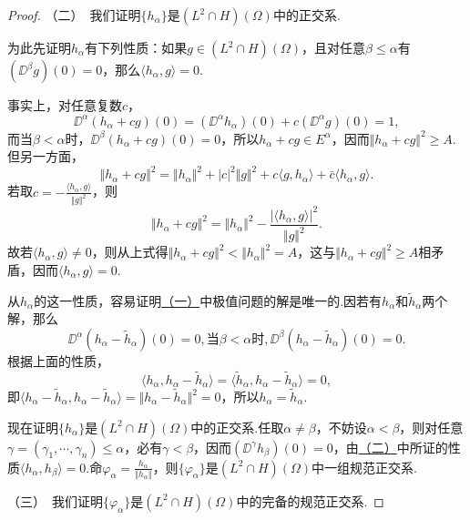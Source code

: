 \begin{proof}
	（二）\,
	我们证明$\{h_\alpha\}$是$(L^2\cap H)(\Omega)$中的正交系.
	
	为此先证明$h_\alpha$有下列性质：如果$g\in(L^2\cap H)(\Omega)$，且对任意$\beta\le\alpha$有$(\DD^\beta g)(0)=0$，那么$\langle h_\alpha,g\rangle=0$.
	
	事实上，对任意复数$c$，
	\[\DD^\alpha (h_\alpha+cg)(0)=(\DD^\alpha h_\alpha)(0)+c(\DD^\alpha g)(0)=1,\]
	而当$\beta<\alpha$时，$\DD^\beta(h_\alpha+cg)(0)=0$，所以$h_\alpha+cg\in E^\alpha$，因而$\Vert h_\alpha+cg\Vert^2\ge A$.但另一方面，
	\[\Vert h_\alpha+cg\Vert^2=\Vert h_\alpha\Vert^2+|c|^2\Vert g\Vert^2+c\langle g,h_\alpha\rangle+\bar{c}\langle h_\alpha,g\rangle.\]
	若取$c=-\frac{\langle h_\alpha,g\rangle}{\Vert g\Vert^2}$，则
	\[\Vert h_\alpha+cg\Vert^2=\Vert h_\alpha\Vert^2-\frac{\left|\langle h_\alpha,g\rangle\right|^2}{\Vert g\Vert^2}.\]
	故若$\langle h_\alpha,g\rangle\neq0$，则从上式得$\Vert h_\alpha+cg\Vert^2<\Vert h_\alpha\Vert^2=A$，这与$\Vert h_\alpha+cg\Vert^2\ge A$相矛盾，因而$\langle h_\alpha,g\rangle=0$.
	
	从$h_\alpha$的这一性质，容易证明\hyperlink{3.1.11}{（一）}中极值问题的解是唯一的.因若有$h_\alpha$和$\tilde{h}_\alpha$两个解，那么
	\[\DD^\alpha(h_\alpha-\tilde{h}_\alpha)(0)=0,\text{当}\beta<\alpha\text{时},\DD^\beta(h_\alpha-\tilde{h}_\alpha)(0)=0.\]
	根据上面的性质，
	\[\langle h_\alpha,h_\alpha-\tilde{h}_\alpha\rangle=\langle\tilde{h}_\alpha,h_\alpha-\tilde{h}_\alpha\rangle=0,\]
	即$\langle h_\alpha-\tilde{h}_\alpha,h_\alpha-\tilde{h}_\alpha\rangle=\Vert h_\alpha-\tilde{h}_\alpha\Vert^2=0$，所以$h_\alpha=\tilde{h}_\alpha$.
	
	现在证明$\{h_\alpha\}$是$(L^2\cap H)(\Omega)$中的正交系.任取$\alpha\neq\beta$，不妨设$\alpha<\beta$，则对任意$\gamma=(\gamma_1,\cdots,\gamma_n)\le\alpha$，必有$\gamma<\beta$，因而$(\DD^\gamma h_\beta)(0)=0$，由\hyperlink{3.1.11}{（二）}中所证的性质$\langle h_\alpha,h_\beta\rangle=0$.命$\varphi_\alpha=\frac{h_\alpha}{\Vert h_\alpha\Vert}$，则$\{\varphi_\alpha\}$是$(L^2\cap H)(\Omega)$中一组规范正交系.
	
	（三）\hypertarget{3.1.11}{}\,
	我们证明$\{\varphi_\alpha\}$是$(L^2\cap H)(\Omega)$中的完备的规范正交系.
	

\end{proof}
